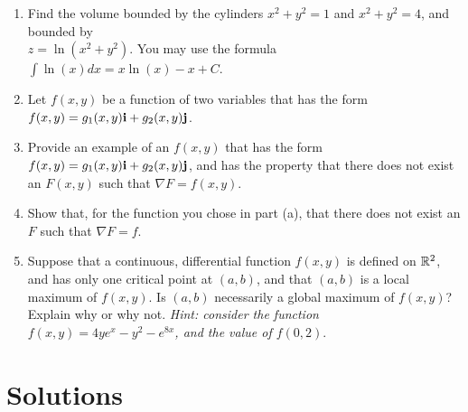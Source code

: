 \documentclass{article}
\begin{document}
\begin{enumerate}
\item %
Find the volume bounded by the cylinders $x^2+y^2=1$ and $x^2+y^2 = 4$, and bounded by \\ $z = \ln(x^2+y^2)$. You may use the formula $\int \ln(x)dx = x\ln(x)-x+C$. 
\newpage
\item %
Let $f(x,y)$ be a function of two variables that has the form $f(x,y) = g_1(x,y)\mathbf{i} + g_2(x,y)\mathbf{j}$.
\BEN
\item Provide an example of an $f(x,y)$ that has the form $f(x,y) = g_1(x,y)\mathbf{i} + g_2(x,y)\mathbf{j}$, and has the property that there does not exist an $F(x,y)$ such that $\nabla F = f(x,y)$. 
\item Show that, for the function you chose in part (a), that there does not exist an $F$ such that $\nabla F=f$.
\EEN
\item %
Suppose that a continuous, differential function $f(x,y)$ is defined on $\mathbb{R}^2$, and has only one critical point at $(a,b)$, and that $(a,b)$ is a local maximum of $f(x,y)$. Is $(a,b)$ necessarily a global maximum of $f(x,y)$? Explain why or why not. \textit{Hint: consider the function $f(x,y)=4ye^x-y^2-e^{8x}$, and the value of $f(0,2)$}.
\end{enumerate} %
\newpage
\section*{Solutions}
\end{document}
